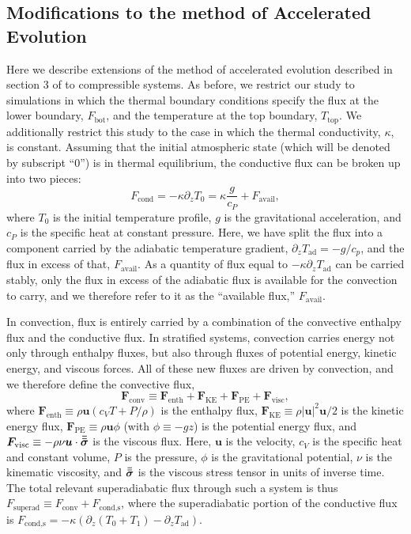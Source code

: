 \subsection{Modifications to the method of Accelerated Evolution}
\label{sec:ae}
Here we describe extensions of the method of accelerated evolution described in section 3 of \cite{anders&all2018} to compressible systems.
As before, we restrict our study to simulations in which the thermal boundary conditions specify the flux at the lower boundary, $F_{\text{bot}}$, and the temperature at the top boundary, $T_{\text{top}}$.
We additionally restrict this study to the case in which the thermal conductivity, $\kappa$, is constant.
Assuming that the initial atmospheric state (which will be denoted by subscript ``0'') is in thermal equilibrium, the conductive flux can be broken up into two pieces:
\begin{equation}
F_{\text{cond}} = -\kappa\partial_z T_0 = \kappa \frac{g}{c_P} + F_{\text{avail}},
\end{equation}
where $T_0$ is the initial temperature profile, $g$ is the gravitational acceleration, and $c_P$ is the specific heat at constant pressure.
Here, we have split the flux into a component carried by the adiabatic temperature gradient, $\partial_z T_{\text{ad}} = -g/c_p$, and the flux in excess of that, $F_{\text{avail}}$.
As a quantity of flux equal to $-\kappa\partial_z T_{\text{ad}}$ can be carried stably, only the flux in excess of the adiabatic flux is available for the convection to carry, and we therefore refer to it as the ``available flux,'' $F_{\text{avail}}$.

In \RB convection, flux is entirely carried by a combination of the convective enthalpy flux and the conductive flux.
In stratified systems, convection carries energy not only through enthalpy fluxes, but also through fluxes of potential energy, kinetic energy, and viscous forces.
All of these new fluxes are driven by convection, and we therefore define the convective flux,
\begin{equation}
\bm{F}_{\text{conv}} \equiv \bm{F}_{\text{enth}} + \bm{F}_{\text{KE}} + \bm{F}_{\text{PE}} + \bm{F}_{\text{visc}},
\end{equation}
where $\bm{F}_{\text{enth}} \equiv \rho\bm{u}(c_V T + P/\rho)$ is the enthalpy flux, $\bm{F}_{\text{KE}} \equiv \rho|\bm{u}|^2\bm{u}/2$ is the kinetic energy flux, $\bm{F}_{\text{PE}} \equiv \rho\bm{u}\phi$ (with $\phi \equiv -gz$) is the potential energy flux, and $\bm{F}_{\text{visc}} \equiv -\rho\nu\bm{u}\cdot\bm{\bar{\bar{\sigma}}}$ is the viscous flux.
Here, $\bm{u}$ is the velocity, $c_V$ is the specific heat and constant volume, $P$ is the pressure, $\phi$ is the gravitational potential, $\nu$ is the kinematic viscosity, and $\bm{\bar{\bar{\sigma}}}$ is the viscous stress tensor in units of inverse time.
The total relevant superadiabatic flux through such a system is thus $F_{\text{superad}} \equiv F_{\text{conv}} + F_{\text{cond,s}}$, where the superadiabatic portion of the conductive flux is $F_{\text{cond,s}} = -\kappa(\partial_z (T_0 + T_1) - \partial_z T_{\text{ad}})$.

